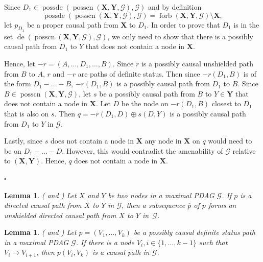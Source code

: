 \documentclass[11pt,a4paper]{article}
\newtheorem{Lemma}[Satz]{Lemma}
\theoremstyle{definition}
\theoremstyle{remark}
\newenvironment{proofof}[1][]{\begin{trivlist}
\item[\hskip \labelsep {\textit{Proof of #1.}}]}{\hfill{}$\square$\end{trivlist}}
\DeclareMathOperator{\Forbb}{forb}
\DeclareMathOperator{\de}{de}
\DeclareMathOperator{\possde}{possde}
\DeclareMathOperator{\possCN}{posscn}
\newcommand{\mpdag}{maximal PDAG}
\newcommand{\g}[1][G]{\mathcal{#1}}
\newcommand{\fb}[2][X,Y]{\Forbb(\mathbf{#1},#2)}
\newcommand{\posscnb}[2][X,Y]{\possCN(\mathbf{#1},#2)}
\begin{document}
\begin{proofof}[Lemma~\ref{lemma:forbIsSame}]
		Since $D_1 \in \possde(\posscnb{\g},\g)$ and by definition 
		\[\possde(\posscnb{\g},\g)= \fb{\g} \setminus \mathbf{X},\] 
		let $p_{D_1}$ be a proper causal path from $\mathbf{X}$ to $D_1$. In order to prove that $D_1$ is in the set $\de(\posscnb{\g},\g)$, we only need to show that there is a possibly causal path from $D_1$ to $Y$ that does not contain a node in $\mathbf{X}$.
		
		Hence, let $-r = ( A, \dots, D_1, \dots,B)$. Since $r$ is a possibly causal unshielded path from $B$ to $A$, $r$ and $-r$ are paths of definite status. Then since $-r(D_1,B)$ is of the form $D_1 - \dots - B$, $-r(D_1,B)$ is a possibly causal path from $D_1$ to $B$.
		Since $B \in \posscnb{\g}$, let $s$ be a possibly causal path from $B$ to $Y \in \mathbf{Y}$ that does not contain a node in $\mathbf{X}$. %
		Let $D$ be the node on $-r(D_1,B)$ closest to $D_1$ that is also on $s$. Then $q= -r(D_1,D) \oplus s(D,Y)$ is a possibly causal path from $D_1$ to $Y$ in $\g$. 
		
		Lastly, since $s$ does not contain a node in $\mathbf{X}$ any node in $\mathbf{X}$ on $q$ would need to be on $D_1 - \dots - D$. However, this would contradict the amenability of $\g$ relative to $(\mathbf{X,Y})$. Hence, $q$ does not contain a node in $\mathbf{X}$.
	
\end{proofof}

\begin{Lemma}(\citealp[Cf.\ Lemma~B.1 in][]{zhang2008completeness} and \citealp[Lemma~3.6 in][]{perkovic17})
	Let $X$ and $Y$ be two nodes in a \mpdag{} $\g$. If $p$ is a directed causal path from $X$ to $Y$ in $\g$, then a subsequence $\overline{p}$ of $p$ forms an unshielded directed causal path from $X$ to $Y$ in~$\g$.
	\label{lemma:unshielded-analog}
\end{Lemma}

\begin{Lemma}(\citealp[Lemma~7.2][]{maathuis2013generalized} and \citealp[Lemma~B.1][]{perkovic17})
	Let $p =(V_1, \dots , V_k)$ be a possibly causal definite status path in a \mpdag{} $\g$. If there is a node $V_i, i \in \{1, \dots, k-1\}$ such that $V_i \rightarrow V_{i+1}$, then $p(V_i, V_k)$ is a causal path in $\g$.
	\label{lemma:unshielded-edges-analog}
\end{Lemma}
\end{document}
